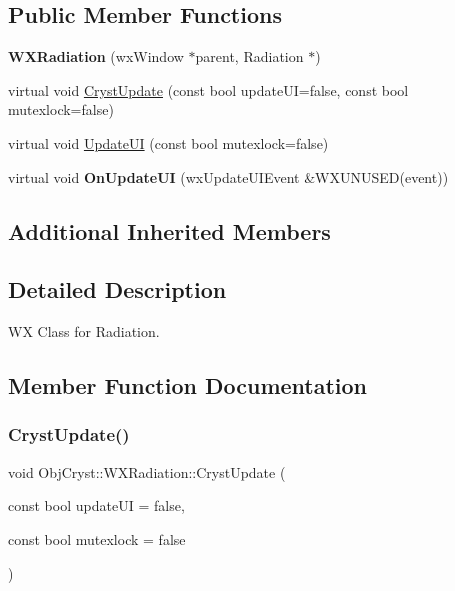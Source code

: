 \subsection*{Public Member Functions}
\begin{DoxyCompactItemize}
\item 
\mbox{\label{class_obj_cryst_1_1_w_x_radiation_ac437d3e356a2abf0fde3a1c7f0d1a7b9}} 
{\bfseries W\+X\+Radiation} (wx\+Window $\ast$parent, Radiation $\ast$)
\item 
virtual void \mbox{\hyperlink{class_obj_cryst_1_1_w_x_radiation_a4a9fcb2010f116506ffebd7a59f55359}{Cryst\+Update}} (const bool update\+UI=false, const bool mutexlock=false)
\item 
virtual void \mbox{\hyperlink{class_obj_cryst_1_1_w_x_radiation_abb1a51ad74c6072019e28bdc19085ecb}{Update\+UI}} (const bool mutexlock=false)
\item 
\mbox{\label{class_obj_cryst_1_1_w_x_radiation_a8cb0853ddf55ffb94dc82cf3076af38c}} 
virtual void {\bfseries On\+Update\+UI} (wx\+Update\+U\+I\+Event \&W\+X\+U\+N\+U\+S\+ED(event))
\end{DoxyCompactItemize}
\subsection*{Additional Inherited Members}


\subsection{Detailed Description}
WX Class for Radiation. 

\subsection{Member Function Documentation}
\mbox{\label{class_obj_cryst_1_1_w_x_radiation_a4a9fcb2010f116506ffebd7a59f55359}} 
\subsubsection{\texorpdfstring{CrystUpdate()}{CrystUpdate()}}
{\footnotesize\ttfamily void Obj\+Cryst\+::\+W\+X\+Radiation\+::\+Cryst\+Update (\begin{DoxyParamCaption}\item[{const bool}]{update\+UI = {\ttfamily false},  }\item[{const bool}]{mutexlock = {\ttfamily false} }\end{DoxyParamCaption})\hspace{0.3cm}{\ttfamily [virtual]}}

